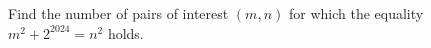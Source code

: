 Find the number of pairs of interest $(m,n)$ for which the equality ${m^{2}+2^{2024}=n^{2}}$ holds. 
